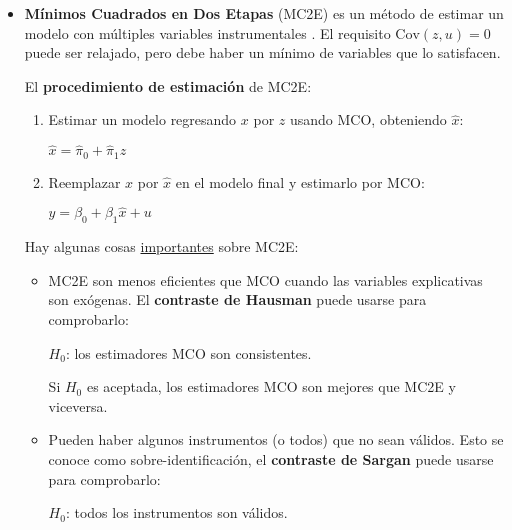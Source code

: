 \documentclass[10pt, a4paper, landscape]{article}
\newcommand{\Cov}{\mathrm{Cov}}
\begin{document}
\begin{multicols}{3}
		\begin{itemize}[leftmargin=*]
			\item \textbf{Mínimos Cuadrados en Dos Etapas} (MC2E) es un método de estimar un modelo con múltiples variables instrumentales . El requisito $\Cov(z, u) = 0$ puede ser relajado, pero debe haber un mínimo de variables que lo satisfacen.
			
			El \textbf{procedimiento de estimación} de MC2E:
			
			\begin{enumerate}[leftmargin=*]
				\item Estimar un modelo regresando $x$ por $z$ usando MCO, obteniendo $\hat{x}$:
				
				\begin{center}
					$\hat{x} = \hat{\pi}_{0} + \hat{\pi}_{1} z$
				\end{center}
				
				\item Reemplazar $x$ por $\hat{x}$ en el modelo final y estimarlo por MCO:
				
				\begin{center}
					$y = \beta_{0} + \beta_{1} \hat{x}+ u$
				\end{center}
			\end{enumerate}
			
			Hay algunas cosas \underline{importantes} sobre MC2E:
			
			\begin{itemize}[leftmargin=*]
				\item MC2E son menos eficientes que MCO cuando las variables explicativas son exógenas. El \textbf{contraste de Hausman} puede usarse para comprobarlo:
				
				\begin{center}
					$H_{0}$: los estimadores MCO son consistentes.
				\end{center}
				
				Si $H_{0}$ es aceptada, los estimadores MCO son mejores que MC2E y viceversa.
				
				\item Pueden haber algunos instrumentos (o todos) que no sean válidos. Esto se conoce como sobre-identificación, el \textbf{contraste de Sargan} puede usarse para comprobarlo:
				
				\begin{center}
					$H_{0}$: todos los instrumentos son válidos.
				\end{center}
			\end{itemize}
		\end{itemize}
		

\end{multicols}
\end{document}
